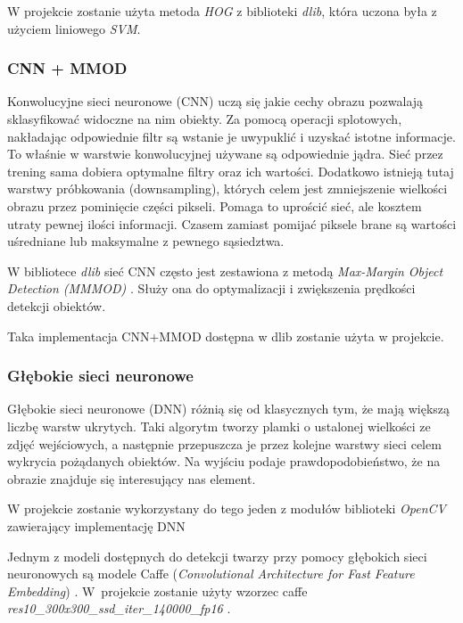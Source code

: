 \vspace{5mm}

W projekcie zostanie użyta metoda \textit{HOG} z biblioteki \textit{dlib}, która uczona była z użyciem liniowego \textit{SVM}.


\subsubsection{CNN + MMOD}
Konwolucyjne sieci neuronowe (CNN) uczą się jakie cechy obrazu pozwalają sklasyfikować widoczne na nim obiekty. Za pomocą operacji splotowych, nakładając odpowiednie filtr są wstanie je uwypuklić i uzyskać istotne informacje. To właśnie w warstwie konwolucyjnej używane są odpowiednie jądra. Sieć przez trening sama dobiera optymalne filtry oraz ich wartości. Dodatkowo istnieją tutaj warstwy próbkowania (downsampling), których celem jest zmniejszenie wielkości obrazu przez pominięcie części pikseli. Pomaga to uprościć sieć, ale kosztem utraty pewnej ilości informacji. Czasem zamiast pomijać piksele brane są wartości uśredniane lub maksymalne z pewnego sąsiedztwa. \cite{jak_cnn}

\vspace{5mm}
W bibliotece \textit{dlib} sieć CNN często jest zestawiona z metodą \textit{Max-Margin Object Detection (MMMOD)} \cite{mmod}. Służy ona do optymalizacji i zwiększenia prędkości detekcji obiektów.
\par
Taka implementacja CNN+MMOD dostępna w dlib zostanie użyta w projekcie.



\subsubsection{Głębokie sieci neuronowe}


Głębokie sieci neuronowe (DNN) różnią się od klasycznych tym, że mają większą liczbę warstw ukrytych. Taki algorytm tworzy plamki o ustalonej wielkości ze zdjęć wejściowych, a następnie przepuszcza je przez kolejne warstwy sieci celem wykrycia pożądanych obiektów. Na wyjściu podaje prawdopodobieństwo, że na obrazie znajduje się interesujący nas element.
\par
W projekcie zostanie wykorzystany do tego jeden z modułów biblioteki \textit{OpenCV} zawierający implementację DNN \cite{opencv_dnn}
\par
Jednym z modeli dostępnych do detekcji twarzy przy pomocy głębokich sieci neuronowych są modele Caffe (\textit{Convolutional Architecture for Fast Feature Embedding}) \cite{jia2014caffe}. W~projekcie zostanie użyty wzorzec caffe \textit{res10{\_}300x300{\_}ssd{\_}iter{\_}140000{\_}fp16} \cite{caffemodel_res10}.


